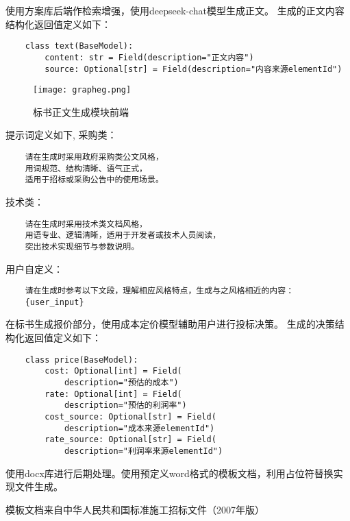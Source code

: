 \documentclass{xmu}
\begin{document}
    使用方案库后端作检索增强，使用deepseek-chat模型生成正文。
    生成的正文内容结构化返回值定义如下：
    \begin{verbatim}
    class text(BaseModel):
        content: str = Field(description="正文内容")
        source: Optional[str] = Field(description="内容来源elementId")
    \end{verbatim}

    \begin{figure}[!htb]
        \centering
        \texttt{[image: grapheg.png]}\\
        \caption{标书正文生成模块前端
        }\label{content}
    \end{figure}

    提示词定义如下,
    采购类：
\begin{verbatim}
    请在生成时采用政府采购类公文风格，
    用词规范、结构清晰、语气正式，
    适用于招标或采购公告中的使用场景。
\end{verbatim}

    技术类：
\begin{verbatim}
    请在生成时采用技术类文档风格，
    用语专业、逻辑清晰，适用于开发者或技术人员阅读，
    突出技术实现细节与参数说明。
\end{verbatim}

    用户自定义：
\begin{verbatim}
    请在生成时参考以下文段，理解相应风格特点，生成与之风格相近的内容：
    {user_input}
\end{verbatim}
    在标书生成报价部分，使用成本定价模型辅助用户进行投标决策。
    生成的决策结构化返回值定义如下：
    \begin{verbatim}
    class price(BaseModel):
        cost: Optional[int] = Field(
            description="预估的成本")
        rate: Optional[int] = Field(
            description="预估的利润率")
        cost_source: Optional[str] = Field(
            description="成本来源elementId")
        rate_source: Optional[str] = Field(
            description="利润率来源elementId")
    \end{verbatim}

    使用docx库进行后期处理。使用预定义word格式的模板文档，利用占位符替换实现文件生成。

    模板文档来自中华人民共和国标准施工招标文件（2007年版）
\end{document}
